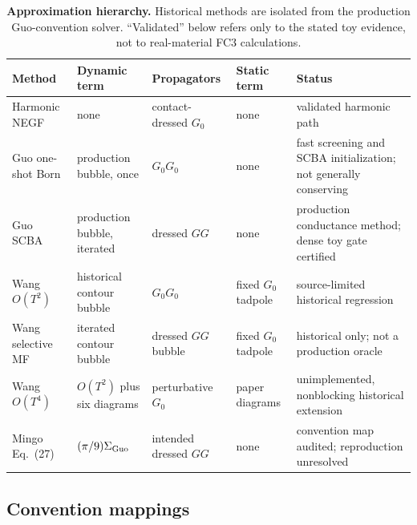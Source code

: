 \documentclass[11pt]{article}
\renewcommand{\_}{\OriginalTextUnderscore\allowbreak}
\begin{document}
\begin{table}[t]
\centering
\caption{\textbf{Approximation hierarchy.} Historical methods are isolated
from the production Guo-convention solver. ``Validated'' below refers only
to the stated toy evidence, not to real-material FC3 calculations.}
\label{tab:approximations}
\small
\begin{tabularx}{\textwidth}{@{}L{29mm}L{28mm}L{29mm}L{27mm}Y@{}}
\toprule
Method & Dynamic term & Propagators & Static term & Status \\
\midrule
Harmonic NEGF & none & contact-dressed \(G_0\) & none &
validated harmonic path \\
Guo one-shot Born & production bubble, once & \(G_0G_0\) & none &
fast screening and SCBA initialization; not generally conserving \\
Guo SCBA & production bubble, iterated & dressed \(GG\) & none &
production conductance method; dense toy gate certified \\
Wang \(O(T^2)\) & historical contour bubble & \(G_0G_0\) &
fixed \(G_0\) tadpole & source-limited historical regression \\
Wang selective MF & iterated contour bubble & dressed \(GG\) bubble &
fixed \(G_0\) tadpole & historical only; not a production oracle \\
Wang \(O(T^4)\) & \(O(T^2)\) plus six diagrams & perturbative \(G_0\) &
paper diagrams & unimplemented, nonblocking historical extension \\
Mingo Eq.~(27) & \((\pi/9)\Sigma_{\rm Guo}\) & intended dressed \(GG\) &
none & convention map audited; reproduction unresolved \\
\bottomrule
\end{tabularx}
\end{table}

\subsection{Convention mappings}
\end{document}
